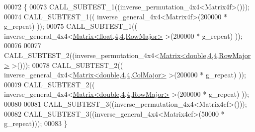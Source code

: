 \begin{DoxyCode}
00072 \{
00073   CALL\_SUBTEST\_1((inverse\_permutation\_4x4<Matrix4f>()));
00074   CALL\_SUBTEST\_1(( inverse\_general\_4x4<Matrix4f>(200000 * g\_repeat) ));
00075   CALL\_SUBTEST\_1(( inverse\_general\_4x4<\hyperlink{group___core___module_class_eigen_1_1_matrix}{Matrix<float,4,4,RowMajor>} >(200000 * 
      g\_repeat) ));
00076 
00077   CALL\_SUBTEST\_2((inverse\_permutation\_4x4<\hyperlink{group___core___module_class_eigen_1_1_matrix}{Matrix<double,4,4,RowMajor>} >()));
00078   CALL\_SUBTEST\_2(( inverse\_general\_4x4<\hyperlink{group___core___module_class_eigen_1_1_matrix}{Matrix<double,4,4,ColMajor>} >(200000 * 
      g\_repeat) ));
00079   CALL\_SUBTEST\_2(( inverse\_general\_4x4<\hyperlink{group___core___module_class_eigen_1_1_matrix}{Matrix<double,4,4,RowMajor>} >(200000 * 
      g\_repeat) ));
00080 
00081   CALL\_SUBTEST\_3((inverse\_permutation\_4x4<Matrix4cf>()));
00082   CALL\_SUBTEST\_3((inverse\_general\_4x4<Matrix4cf>(50000 * g\_repeat)));
00083 \}
\end{DoxyCode}

